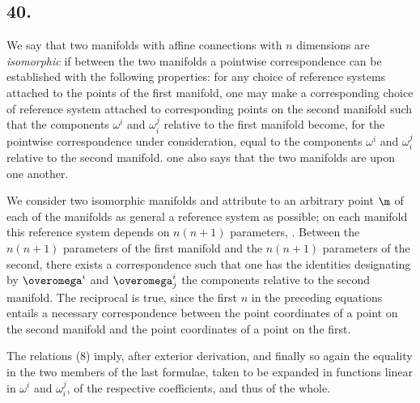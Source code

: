 \subsection*{40.}

\nc{\overomega}{\overline{\omega}}

We say that two manifolds with affine connections with $n$ dimensions are \textit{isomorphic} if between the two manifolds a pointwise correspondence can be established with the following properties: for any choice of reference systems attached to the points of the first manifold, one may make a corresponding choice of reference system attached to corresponding points on the second manifold such that the components $\omega^i$ and $\omega_i^j$ relative to the first manifold become, for the pointwise correspondence under consideration, equal to the components $\omega^i$ and $\omega_i^j$ relative to the second manifold. one also says that the two manifolds are  upon one another.

We consider two isomorphic manifolds and attribute to an arbitrary point $\m$ of each of the manifolds as general a reference system as possible; on each manifold this reference system depends on $n(n+1)$ parameters, . Between the $n(n+1)$ parameters of the first manifold and the $n(n+1)$ parameters of the second, there exists a correspondence such that one has the identities
designating by $\overomega^i$ and $\overomega_j^i$ the components relative to the second manifold. The reciprocal is true, since the first $n$ in the preceding equations  entails a necessary correspondence between the point coordinates of a point on the second manifold and the point coordinates of a point on the first.

The relations (8) imply, after exterior derivation,
and finally
so again the equality in the two members of the last formulae, taken to be expanded in functions linear in $\omega^i$ and $\omega_i^j$, of the respective coefficients, and thus of the whole.